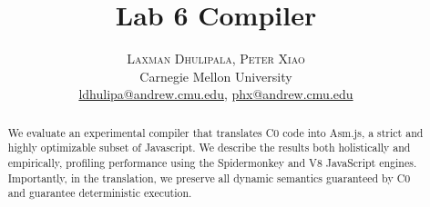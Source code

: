 \documentclass[twoside]{article}
\title{\vspace{-15mm}\fontsize{20pt}{10pt}\selectfont\textbf{Lab 6 Compiler}} %
\author{
\large
\textsc{Laxman Dhulipala, Peter Xiao}\\[2mm] %
\normalsize Carnegie Mellon University \\ %
\normalsize \href{mailto:ldhulipa@andrew.cmu.edu}{ldhulipa@andrew.cmu.edu}, \href{mailto:phx@andrew.cmu.edu}{phx@andrew.cmu.edu} %
\vspace{-5mm}
}
\date{}
\begin{document}
\maketitle %

\thispagestyle{fancy} %


\begin{abstract}

\noindent We evaluate an experimental compiler that translates C0 code into Asm.js, a strict
and highly optimizable subset of Javascript. We describe the results both holistically and empirically,
profiling performance using the Spidermonkey and V8 JavaScript engines. Importantly, in the
translation, we preserve all dynamic semantics guaranteed by C0 and guarantee deterministic execution.

\end{abstract}

\end{document}
